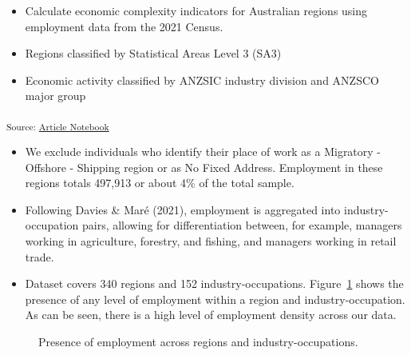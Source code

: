 \documentclass[
]{agujournal2019}
\begin{document}
\begin{itemize}
\item
  Calculate economic complexity indicators for Australian regions using
  employment data from the 2021 Census.
\item
  Regions classified by Statistical Areas Level 3 (SA3)
\item
  Economic activity classified by ANZSIC industry division and ANZSCO
  major group
\end{itemize}

\textsubscript{Source:
\href{https://aiti-flinders.github.io/sirp-complexity/index.qmd.html}{Article
Notebook}}

\begin{itemize}
\item
  We exclude individuals who identify their place of work as a Migratory
  - Offshore - Shipping region or as No Fixed Address. Employment in
  these regions totals 497,913 or about 4\% of the total sample.
\item
  Following Davies \& Maré (2021), employment is aggregated into
  industry-occupation pairs, allowing for differentiation between, for
  example, managers working in agriculture, forestry, and fishing, and
  managers working in retail trade.
\item
  Dataset covers 340 regions and 152 industry-occupations.
  Figure~\ref{fig-employment-density} shows the presence of any level of
  employment within a region and industry-occupation. As can be seen,
  there is a high level of employment density across our data.
\end{itemize}

\label{cell-fig-employment-density}
\begin{figure}[H]


\caption{\label{fig-employment-density}Presence of employment across
regions and industry-occupations.}

\end{figure}%
\end{document}
